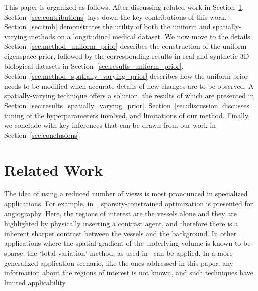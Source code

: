 \documentclass[journal]{IEEEtran}
\begin{document}
 This paper is organized as follows. After discussing related work in
 Section~\ref{sec:related}, Section~\ref{sec:contributions} lays down
 the key contributions of this work. Section~\ref{sec:tmh}
 demonstrates the utility of both the uniform and spatially-varying
 methods on a longitudinal medical dataset. We now move to the
 details. Section~\ref{sec:method_uniform_prior} describes the
 construction of the uniform eigenspace prior, followed by the
 corresponding results in real and synthetic 3D biological datasets in
 Section~\ref{sec:results_uniform_prior}. Section~\ref{sec:method_spatially_varying_prior}
 describes how the uniform prior needs to be modified when accurate
 details of new changes are to be observed. A spatially-varying
 technique offers a solution, the results of which are presented in
 Section~\ref{sec:results_spatially_varying_prior}. Section~\ref{sec:discussion}
 discusses tuning of the hyperparameters involved, and limitations of
 our method. Finally, we conclude with key inferences that can be
 drawn from our work in Section~\ref{sec:conclusions}.


 

 \section{Related Work}
\label{sec:related}
The idea of using a reduced number of views is most pronounced in
specialized applications. For example, in~\cite{Essam2015},
sparsity-constrained optimization is presented for angiography. Here,
the regions of interest are the vessels alone and they are highlighted
by physically inserting a contrast agent, and therefore there is a
inherent sharper contrast between the vessels and the background.  In
other applications where the spatial-gradient of the underlying volume
is known to be sparse, the `total variation' method, as used
in~\cite{Li2015,Polak2017} can be applied.  In a more generalized
application scenario, like the ones addressed in this paper, any
information about the regions of interest is not known, and such
techniques have limited applicability. 
\end{document}
